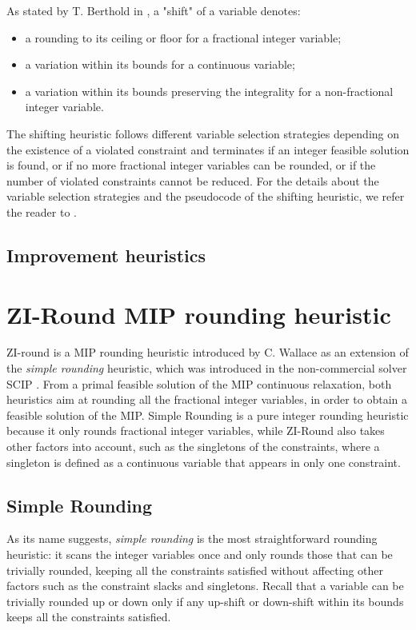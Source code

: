 \documentclass[a4paper,12pt,twoside]{scrbook}
\begin{document}
As stated by T. Berthold in \cite{berthold2006}, a "shift" of a variable denotes:
\begin{itemize}
	\item a rounding to its ceiling or floor for a fractional integer variable;
	\item a variation within its bounds for a continuous variable;
	\item a variation within its bounds preserving the integrality for a non-fractional integer variable.
\end{itemize}
The shifting heuristic follows different variable selection strategies depending on the existence of a violated constraint and terminates if an integer feasible solution is found, or if no more fractional integer variables can be rounded, or if the number of violated constraints cannot be reduced. For the details about the variable selection strategies and the pseudocode of the shifting heuristic, we refer the reader to \cite{berthold2006}. 

\section{Improvement heuristics} \label{sec:improvementheur}

\chapter{ZI-Round MIP rounding heuristic} \label{ch:ziround}
ZI-round is a MIP rounding heuristic introduced by C. Wallace \cite{wallace2010} as an extension of the \textit{simple rounding} heuristic, which was introduced in the non-commercial solver SCIP \cite{scip}.
From a primal feasible solution of the MIP continuous relaxation, both heuristics aim at rounding all the fractional integer variables, in order to obtain a feasible solution of the MIP. Simple Rounding is a pure integer rounding heuristic because it only rounds fractional integer variables, while ZI-Round also takes other factors into account, such as the singletons of the constraints, where a singleton is defined as a continuous variable that appears in only one constraint. \par

\section{Simple Rounding} \label{sec:simplerounding}
As its name suggests, \textit{simple rounding} is the most straightforward rounding heuristic: it scans the integer variables once and only rounds those that can be trivially rounded, keeping all the constraints satisfied without affecting other factors such as the constraint slacks and singletons.
Recall that a variable can be trivially rounded up or down only if any up-shift or down-shift within its bounds keeps all the constraints satisfied. \par
\end{document}
